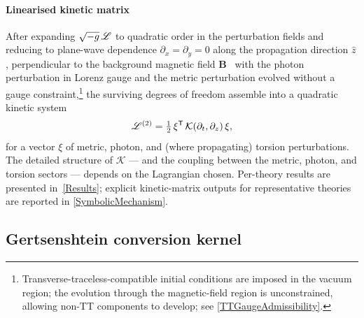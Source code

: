 \paragraph*{Linearised kinetic matrix}
After expanding $\sqrt{-g}\,\mathscr{L}$ to quadratic order in the
perturbation fields and reducing to plane-wave dependence
$\partial_x = \partial_y = 0$ along the propagation direction
$\hat{z}$, perpendicular to the background magnetic field
$\bm{B}$~\cite{gertsenshtein1962wave,boccaletti1970conversion,raffelt1988mixing,cillis1996graviton,ejlli2020graviton,palessandro2023simple,palessandro2024gertsenshtein,lella2024constraining,domcke2025scattering}
with the photon perturbation in Lorenz gauge and the metric
perturbation evolved without a gauge constraint,\footnote{
Transverse-traceless-compatible initial conditions are imposed
in the vacuum region; the
evolution through the magnetic-field region is unconstrained,
allowing non-TT components to develop; see
\cref{TTGaugeAdmissibility}.} the surviving degrees of freedom
assemble into a quadratic kinetic system
\begin{align}
  \mathscr{L}^{(2)} = \tfrac{1}{2}\,\xi^\mathsf{T}\,
    \mathcal{K}(\partial_t,\partial_z)\,\xi,
  \label{KineticMatrix}
\end{align}
for a vector $\xi$ of metric, photon, and (where
propagating) torsion perturbations. The detailed structure of
$\mathcal{K}$ --- and the coupling between the metric, photon, and
torsion sectors --- depends on the Lagrangian chosen. Per-theory
results are presented in~\cref{Results}; explicit kinetic-matrix
outputs for representative theories are reported in
\cref{SymbolicMechanism}.

\subsection{Gertsenshtein conversion kernel}%
\label{Gertsenshtein}

